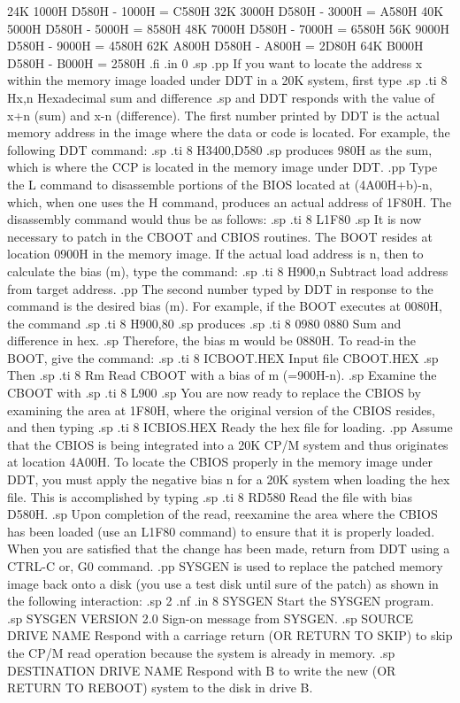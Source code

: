 24K          1000H     D580H - 1000H = C580H
32K          3000H     D580H - 3000H = A580H
40K          5000H     D580H - 5000H = 8580H
48K          7000H     D580H - 7000H = 6580H
56K          9000H     D580H - 9000H = 4580H
62K          A800H     D580H - A800H = 2D80H
64K          B000H     D580H - B000H = 2580H
.fi
.in 0
.sp
.pp
If you want to locate the address x within the memory image 
loaded under DDT in a 20K system, first type
.sp
.ti 8
Hx,n            Hexadecimal sum and difference
.sp
and DDT responds with the value of x+n (sum) and x-n 
(difference).  The first number printed by DDT is the actual memory 
address in the image where the data or code is located.  For example,
the following DDT command:
.sp
.ti 8
H3400,D580
.sp
produces 980H as the sum, which is where the CCP 
is located in the memory image under DDT.
.pp
Type the L command to disassemble portions of the 
BIOS located at (4A00H+b)-n, which, when one uses the H command, 
produces an actual address of 1F80H.  The disassembly command 
would thus be as follows:
.sp
.ti 8
L1F80
.sp
It is now necessary to patch in the CBOOT and CBIOS routines.  The BOOT
resides at location 0900H in the memory image.  If the actual 
load address is n, then to calculate the bias (m), 
type the command:
.sp
.ti 8
H900,n          Subtract load address from target address.
.pp
The second number typed by DDT in response to the command is the 
desired bias (m).  For example, if the BOOT executes at 0080H, 
the command
.sp
.ti 8
H900,80
.sp
produces
.sp
.ti 8
0980 0880       Sum and difference in hex.
.sp
Therefore, the bias m would be 0880H.  To read-in the BOOT, give the command:
.sp
.ti 8
ICBOOT.HEX      Input file CBOOT.HEX
.sp
Then
.sp
.ti 8
Rm              Read CBOOT with a bias of m (=900H-n).
.sp
Examine the CBOOT with
.sp
.ti 8
L900
.sp
You are now ready to replace the CBIOS by examining the area at 
1F80H, where the original version of the CBIOS resides, and then 
typing
.sp
.ti 8
ICBIOS.HEX      Ready the hex file for loading.
.pp
Assume that the CBIOS is being integrated into a 20K 
CP/M system and thus originates at location 4A00H.  To locate the 
CBIOS properly in the memory image under DDT, you must apply the 
negative bias n for a 20K system when loading the hex file.  This 
is accomplished by typing
.sp
.ti 8
RD580           Read the file with bias D580H.
.sp
Upon completion of the read, reexamine the area 
where the CBIOS has been loaded (use an L1F80 command) to ensure 
that it is properly loaded.  When you are satisfied that the change has 
been made, return from DDT using a CTRL-C or, G0 command.
.pp
SYSGEN is used to replace the patched memory image back onto a 
disk (you use a test disk until sure of the 
patch) as shown in the following interaction:
.sp 2
.nf
.in 8
SYSGEN                    Start the SYSGEN program.
.sp
SYSGEN VERSION 2.0        Sign-on message from SYSGEN.
.sp
SOURCE DRIVE NAME         Respond with a carriage return
(OR RETURN TO SKIP)       to skip the CP/M read operation
                          because the system is already
                          in memory.
.sp
DESTINATION DRIVE NAME    Respond with B to write the new
(OR RETURN TO REBOOT)     system to the disk in drive B.

